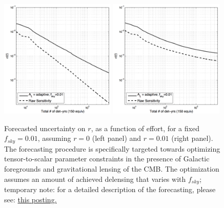 \begin{figure}[h]
\centering
\includegraphics[width=0.49\textwidth]{Inflation/sigr_effort_r0.png}
\includegraphics[width=0.49\textwidth]{Inflation/sigr_effort_r01.png}
\caption{Forecasted uncertainty on $r$, as a function of effort, for a fixed
$f_{sky}=0.01$, assuming $r=0$ (left panel) and $r=0.01$ (right panel).
The forecasting procedure is specifically targeted
towards optimizing tensor-to-scalar parameter constraints in the presence of 
Galactic foregrounds and gravitational lensing of the CMB. The optimization 
assumes an amount of achieved delensing that varies with $f_{sky}$; temporary 
note: for a detailed description of the forecasting, please see: 
\href{http://users.physics.harvard.edu/~buza/20150331_fisher/}{this posting.}  
}
\label{fig_rforecast2}
\end{figure}


